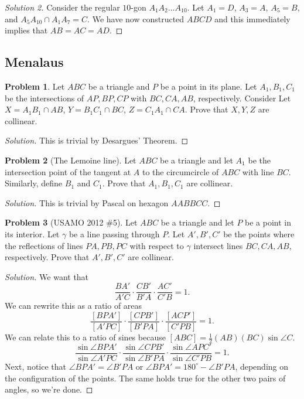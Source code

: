 \documentclass[a4paper]{article}
\theoremstyle{definition}
\newtheorem{problem}{Problem}[subsection]
\begin{document}
\begin{proof}[Solution 2]
Consider the regular $10$-gon $A_1A_2...A_{10}$.
Let $A_1 = D$, $A_3 = A$, $A_5 = B$, and $A_5A_{10} \cap A_1A_7 = C$. We have now constructed $ABCD$ and this immediately implies that $AB = AC = AD$.
\end{proof}

\subsection{Menalaus}

\begin{problem}
Let $ABC$ be a triangle and $P$ be a point in its plane. Let $A_1, B_1, C_1$ be the intersections of $AP, BP, CP$ with $BC, CA, AB$, respectively. Consider Let $X = A_1B_1 \cap AB$, $Y = B_1C_1 \cap BC$, $Z = C_1A_1 \cap CA$. Prove that $X, Y, Z$ are collinear.
\end{problem}

\begin{proof}[Solution]
This is trivial by Desargues' Theorem.
\end{proof}

\begin{problem}[The Lemoine line]
Let $ABC$ be a triangle and let $A_1$ be the intersection point of the tangent at $A$ to the circumcircle of $ABC$ with line $BC$. Similarly, define $B_1$ and $C_1$. Prove that $A_1, B_1, C_1$ are collinear.
\end{problem}

\begin{proof}[Solution]
This is trivial by Pascal on hexagon $AABBCC$.
\end{proof}

\begin{problem}[USAMO 2012 \#5]
Let $ABC$ be a triangle and let $P$ be a point in its interior. Let $\gamma$ be a line passing through $P$. Let $A', B', C'$ be the points where the reflections of lines $PA, PB, PC$ with respect to $\gamma$ intersect lines $BC, CA, AB$, respectively. Prove that $A', B', C'$ are collinear. 
\end{problem}

\begin{proof}[Solution]
We want that
\[ \frac{BA'}{A'C} \cdot \frac{CB'}{B'A} \cdot \frac{AC'}{C'B} = 1. \]
We can rewrite this as a ratio of areas
\[ \frac{\left[BPA'\right]}{\left[A'PC\right]} \cdot \frac{\left[CPB'\right]}{\left[B'PA\right]} \cdot \frac{\left[ACP'\right]}{\left[C'PB\right]} = 1. \]
We can relate this to a ratio of sines because $\left[ABC\right] = \frac{1}{2} \left(AB\right) \left(BC\right) \sin \angle C$.
\[ \frac{\sin \angle BPA'}{\sin \angle A'PC} \cdot \frac{\sin \angle CPB'}{\sin \angle B'PA} \cdot \frac{\sin \angle APC'}{\sin \angle C'PB} = 1. \]
Next, notice that $\angle BPA' = \angle B'PA$ or $\angle BPA' = 180^{\circ} - \angle B'PA$, depending on the configuration of the points. The same holds true for the other two pairs of angles, so we're done.
\end{proof}
\end{document}
